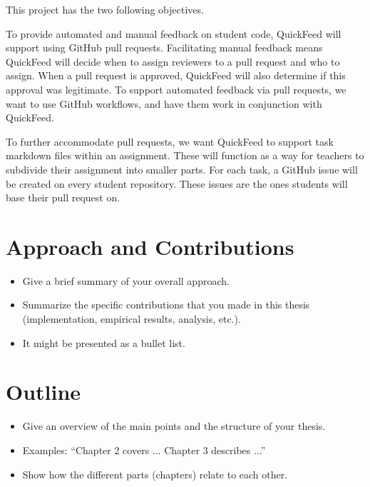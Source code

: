 This project has the two following objectives.

To provide automated and manual feedback on student code, QuickFeed will support using GitHub pull requests.
Facilitating manual feedback means QuickFeed will decide when to assign reviewers to a pull request and who to assign.
When a pull request is approved, QuickFeed will also determine if this approval was legitimate.
To support automated feedback via pull requests, we want to use GitHub workflows, and have them work in conjunction with QuickFeed.

To further accommodate pull requests, we want QuickFeed to support task markdown files within an assignment.
These will function as a way for teachers to subdivide their assignment into smaller parts.
For each task, a GitHub issue will be created on every student repository.
These issues are the ones students will base their pull request on.

\section{Approach and Contributions}

\begin{itemize}
\item Give a brief summary of your overall approach.
\item Summarize the specific contributions that you made in this thesis (implementation, empirical results, analysis, etc.).
\item It might be presented as a bullet list.
\end{itemize}


\section{Outline}

\begin{itemize}
\item Give an overview of the main points and the structure of your thesis.
\item Examples: ``Chapter 2 covers ...  Chapter 3 describes ...''
\item Show how the different parts (chapters) relate to each other.
\end{itemize}
